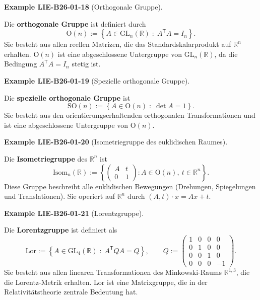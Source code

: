 \documentclass[10pt, letterpaper]{article}
\newcommand{\CustomHeading}[3]{%
  \par\medskip\noindent%
  \textbf{#1 #2} \textnormal{(#3)}.\enskip%
}
\newenvironment{EXA}[2]{\begin{unitbox}\CustomHeading{Example}{#1}{#2}}{\end{unitbox}}
\begin{document}
\begin{EXA}{LIE-B26-01-18}{Orthogonale Gruppe}
Die \textbf{orthogonale Gruppe} ist definiert durch
\[
\mathrm{O}(n)
:= \left\{ A \in \mathrm{GL}_{n}(\mathbb{R}) \; : \; A^{\mathsf{T}} A = I_{n} \right\}.
\]
Sie besteht aus allen reellen Matrizen, die das Standardskalarprodukt auf $\mathbb{R}^{n}$ erhalten.  
$\mathrm{O}(n)$ ist eine abgeschlossene Untergruppe von $\mathrm{GL}_{n}(\mathbb{R})$, da die Bedingung $A^{\mathsf{T}}A = I_{n}$ stetig ist.
\end{EXA}



\begin{EXA}{LIE-B26-01-19}{Spezielle orthogonale Gruppe}
Die \textbf{spezielle orthogonale Gruppe} ist
\[
\mathrm{SO}(n)
:= \left\{ A \in \mathrm{O}(n) \; : \; \det A = 1 \right\}.
\]
Sie besteht aus den orientierungserhaltenden orthogonalen Transformationen und ist eine abgeschlossene Untergruppe von $\mathrm{O}(n)$.
\end{EXA}



\begin{EXA}{LIE-B26-01-20}{Isometriegruppe des euklidischen Raumes}
Die \textbf{Isometriegruppe} des $\mathbb{R}^{n}$ ist
\[
\mathrm{Isom}_{n}(\mathbb{R})
:= \left\{
\begin{pmatrix}
A & t \\[3pt]
0 & 1
\end{pmatrix}
: A \in \mathrm{O}(n),\ t \in \mathbb{R}^{n}
\right\}.
\]
Diese Gruppe beschreibt alle euklidischen Bewegungen (Drehungen, Spiegelungen und Translationen).  
Sie operiert auf $\mathbb{R}^{n}$ durch $(A,t)\cdot x = A x + t$.
\end{EXA}



\begin{EXA}{LIE-B26-01-21}{Lorentzgruppe}
Die \textbf{Lorentzgruppe} ist definiert als
\[
\mathrm{Lor}
:= \left\{
A \in \mathrm{GL}_{4}(\mathbb{R}) \; : \; A^{\mathsf{T}} Q A = Q
\right\},
\qquad
Q :=
\begin{pmatrix}
1 & 0 & 0 & 0 \\
0 & 1 & 0 & 0 \\
0 & 0 & 1 & 0 \\
0 & 0 & 0 & -1
\end{pmatrix}.
\]
Sie besteht aus allen linearen Transformationen des Minkowski-Raums $\mathbb{R}^{1,3}$, die die Lorentz-Metrik erhalten.  
$\mathrm{Lor}$ ist eine Matrixgruppe, die in der Relativitätstheorie zentrale Bedeutung hat.
\end{EXA}
\end{document}
